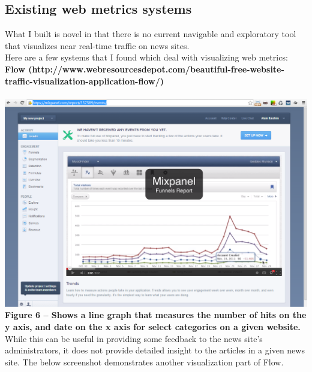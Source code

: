 \documentclass[12pt]{article}
\begin{document}
\subsection{Existing web metrics systems}
What I built is novel in that there is no current navigable and exploratory tool that visualizes near real-time traffic on news sites. \\
Here are a few systems that I found which deal with visualizing web metrics: \\

\noindent\textbf{Flow (http://www.webresourcesdepot.com/beautiful-free-website-traffic-visualization-application-flow/)} \\ \\
\noindent\includegraphics[scale=0.45]{img/flow}
\noindent\textbf{Figure 6 -- Shows a line graph that measures the number of hits on the y axis, and date on the x axis for select categories on a given website.} \\

While this can be useful in providing some feedback to the news site's administrators, it does not provide detailed insight to the articles in a given news site. The below screenshot demonstrates another visualization part of Flow. \\

\vfill
\end{document}
